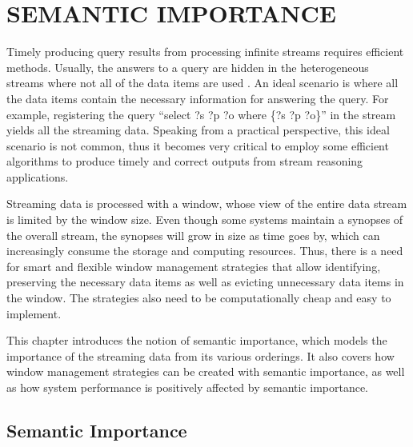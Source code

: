  
\chapter{SEMANTIC IMPORTANCE} 
Timely producing query results from processing infinite streams requires efficient methods.
Usually, the answers to a query are hidden in the heterogeneous streams where not all of the data items are used \cite{mileo2013streamrule}. 
An ideal scenario is where all the data items contain the necessary information for answering the query.
For example, registering the query ``select ?s ?p ?o where \{?s ?p ?o\}'' in the stream yields all the streaming data.
Speaking from a practical perspective, this ideal scenario is not common, thus it becomes very critical to employ some efficient algorithms to produce timely and correct outputs from stream reasoning applications.

Streaming data is processed with a window, whose view of the entire data stream is limited by the window size. 
Even though some systems maintain a synopses of the overall stream, the synopses will grow in size as time goes by, which can increasingly consume the storage and computing resources. 
Thus, there is a need for smart and flexible window management strategies that allow identifying, preserving the necessary data items as well as evicting unnecessary data items in the window. 
The strategies also need to be computationally cheap and easy to implement. 

This chapter introduces the notion of semantic importance, which models the importance of the streaming data from its various orderings.
It also covers how window management strategies can be created with semantic importance, as well as how system performance is positively affected by semantic importance. 
%
\section{Semantic Importance}

